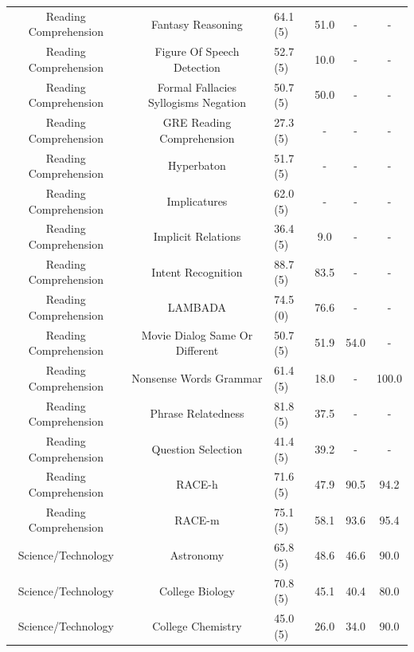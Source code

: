 \documentclass[11pt, a4paper, logo, internal, copyright, nonumbering]{deepmind}
\begin{document}
\begin{center}
\begin{longtable}{cclccc}
  Reading Comprehension &                     Fantasy Reasoning &   64.1 (5) &  51.0 &   - &          - \\
  Reading Comprehension &            Figure Of Speech Detection &   52.7 (5) &  10.0 &   - &          - \\
  Reading Comprehension &  Formal Fallacies Syllogisms Negation &   50.7 (5) &  50.0 &   - &          - \\
  Reading Comprehension &             GRE Reading Comprehension &   27.3 (5) &   - &   - &          - \\
  Reading Comprehension &                            Hyperbaton &   51.7 (5) &   - &   - &          - \\
  Reading Comprehension &                          Implicatures &   62.0 (5) &   - &   - &          - \\
  Reading Comprehension &                    Implicit Relations &   36.4 (5) &   9.0 &   - &          - \\
  Reading Comprehension &                  Intent Recognition &   88.7 (5) &  83.5 &   - &          - \\
  Reading Comprehension &                              LAMBADA &   74.5 (0) &   76.6 &   - &          - \\
  Reading Comprehension &      Movie Dialog Same Or Different &   50.7 (5) &  51.9 &  54.0 &          - \\
  Reading Comprehension &                Nonsense Words Grammar &   61.4 (5) &  18.0 &   - &        100.0 \\
  Reading Comprehension &                    Phrase Relatedness &   81.8 (5) &  37.5 &   - &          - \\
  Reading Comprehension &                  Question Selection &   41.4 (5) &  39.2 &   - &          - \\
  Reading Comprehension &                              RACE-h &   71.6 (5) &  47.9 &  90.5 &         94.2 \\
  Reading Comprehension &                              RACE-m &   75.1 (5) &  58.1 &  93.6 &         95.4 \\
     Science/Technology &                            Astronomy &   65.8 (5) &  48.6 &  46.6 &         90.0 \\
     Science/Technology &                      College Biology &   70.8 (5) &  45.1 &  40.4 &         80.0 \\
     Science/Technology &                    College Chemistry &   45.0 (5) &  26.0 &  34.0 &         90.0 \\

\end{longtable}
\end{center}
\end{document}
